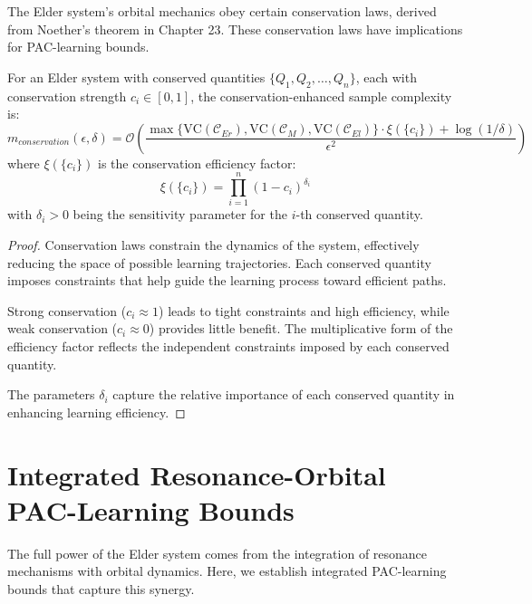 The Elder system's orbital mechanics obey certain conservation laws, derived from Noether's theorem in Chapter 23. These conservation laws have implications for PAC-learning bounds.

\begin{theorem}
For an Elder system with conserved quantities $\{Q_1, Q_2, \ldots, Q_n\}$, each with conservation strength $c_i \in [0, 1]$, the conservation-enhanced sample complexity is:
\begin{equation}
m_{conservation}(\epsilon, \delta) = \mathcal{O}\left(\frac{\max\{\text{VC}(\mathcal{C}_{Er}), \text{VC}(\mathcal{C}_{M}), \text{VC}(\mathcal{C}_{El})\} \cdot \xi(\{c_i\}) + \log(1/\delta)}{\epsilon^2}\right)
\end{equation}
where $\xi(\{c_i\})$ is the conservation efficiency factor:
\begin{equation}
\xi(\{c_i\}) = \prod_{i=1}^{n} (1 - c_i)^{\delta_i}
\end{equation}
with $\delta_i > 0$ being the sensitivity parameter for the $i$-th conserved quantity.
\end{theorem}

\begin{proof}
Conservation laws constrain the dynamics of the system, effectively reducing the space of possible learning trajectories. Each conserved quantity imposes constraints that help guide the learning process toward efficient paths.

Strong conservation ($c_i \approx 1$) leads to tight constraints and high efficiency, while weak conservation ($c_i \approx 0$) provides little benefit. The multiplicative form of the efficiency factor reflects the independent constraints imposed by each conserved quantity.

The parameters $\delta_i$ capture the relative importance of each conserved quantity in enhancing learning efficiency.
\end{proof}

\section{Integrated Resonance-Orbital PAC-Learning Bounds}

The full power of the Elder system comes from the integration of resonance mechanisms with orbital dynamics. Here, we establish integrated PAC-learning bounds that capture this synergy.

